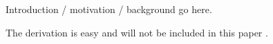 Introduction / motivation / background go here.

The derivation is easy and will not be included in this paper \cite{clm}.
